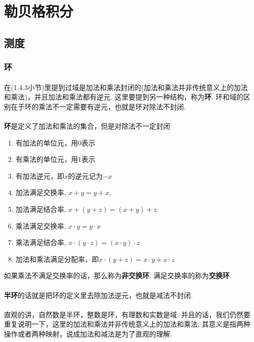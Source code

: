 \section{勒贝格积分}

\subsection{测度}
\subsubsection{环}
\paragraph{}
在(1.4.3小节)里提到过域是加法和乘法封闭的(加法和乘法并非传统意义上的加法和乘法)，并且加法和乘法都有逆元. 这里要提到另一种结构，称为\textbf{环}.  环和域的区别在于环的乘法不一定需要有逆元，也就是环对除法不封闭. 

\paragraph{}
\textbf{环}是定义了加法和乘法的集合，但是对除法不一定封闭
\begin{enumerate}
\item 有加法的单位元，用$0$表示
\item 有乘法的单位元，用$1$表示
\item 有加法逆元，即$x$的逆元记为$-x$
\item 加法满足交换率, $x + y = y + x$.
\item 加法满足结合率, $x + (y + z) = (x + y) + z$
\item 乘法满足交换率, $x \cdot y = y \cdot x$
\item 乘法满足结合率, $x \cdot (y \cdot z) = (x \cdot y) \cdot z$
\item 加法和乘法满足分配率，即$x \cdot (y + z) = x\cdot y + x \cdot z$
\end{enumerate}
如果乘法不满足交换率的话，那么称为\textbf{非交换环}. 满足交换率的称为\textbf{交换环}.

\paragraph{}
\textbf{半环}的话就是把环的定义里去除加法逆元，也就是减法不封闭. 

\paragraph{}
直观的讲，自然数是半环，整数是环，有理数和实数是域. 并且的话，我们仍然要重复说明一下，这里的加法和乘法并非传统意义上的加法和乘法, 其意义是指两种操作或者两种映射，说成加法和减法是为了直观的理解. 

